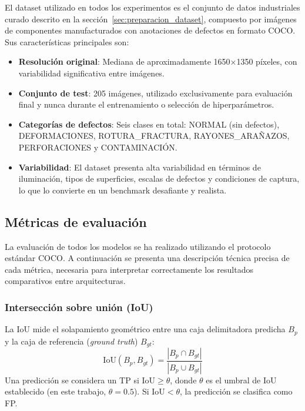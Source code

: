 El dataset utilizado en todos los experimentos es el conjunto de datos industriales curado descrito en la sección~\ref{sec:preparacion_dataset}, compuesto por imágenes de componentes manufacturados con anotaciones de defectos en formato COCO. Sus características principales son:

\begin{itemize}
    \item \textbf{Resolución original}: Mediana de aproximadamente 1650×1350 píxeles, con variabilidad significativa entre imágenes.
    \item \textbf{Conjunto de test}: 205 imágenes, utilizado exclusivamente para evaluación final y nunca durante el entrenamiento o selección de hiperparámetros.
    \item \textbf{Categorías de defectos}: Seis clases en total: NORMAL (sin defectos), DEFORMACIONES, \mbox{ROTURA\_FRACTURA}, \mbox{RAYONES\_ARAÑAZOS}, PERFORACIONES y CONTAMINACIÓN.
    \item \textbf{Variabilidad}: El dataset presenta alta variabilidad en términos de iluminación, tipos de superficies, escalas de defectos y condiciones de captura, lo que lo convierte en un benchmark desafiante y realista.
\end{itemize}

\subsection{Métricas de evaluación}
\label{subsec:metricas}

La evaluación de todos los modelos se ha realizado utilizando el protocolo estándar COCO. A continuación se presenta una descripción técnica precisa de cada métrica, necesaria para interpretar correctamente los resultados comparativos entre arquitecturas.

\subsubsection{Intersección sobre unión (IoU)}

La \acrfull{IoU} mide el solapamiento geométrico entre una caja delimitadora predicha $B_p$ y la caja de referencia (\textit{ground truth}) $B_{gt}$:
\begin{equation}
\text{IoU}(B_p, B_{gt}) = \frac{|B_p \cap B_{gt}|}{|B_p \cup B_{gt}|}
\label{eq:iou}
\end{equation}
Una predicción se considera un \acrfull{TP} si $\text{IoU} \geq \theta$, donde $\theta$ es el umbral de IoU establecido (en este trabajo, $\theta = 0.5$). Si $\text{IoU} < \theta$, la predicción se clasifica como \acrfull{FP}.


